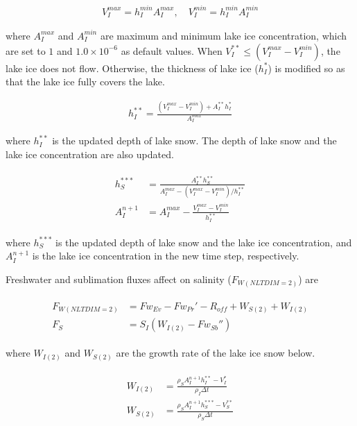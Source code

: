 \begin{eqnarray}
  V_I^{max} = h_I^{min}A_I^{max}, \quad V_I^{min} = h_I^{min}A_I^{min}
\end{eqnarray}

where \(A_I^{max}\) and \(A_I^{min}\) are maximum and minimum lake ice concentration, which are set to \(1\) and \(1.0\times 10^{-6}\) as default values. When
\(V_I^{\ast\ast} \le (V_I^{max}-V_I^{min})\), the lake ice does not flow. Otherwise, the thickness of lake ice (\(h_I^{\ast}\)) is modified so as that the lake ice fully covers the lake.

\begin{eqnarray}
  h_I^{\ast\ast} = \frac{(V_I^{max}-V_I^{min})+A_I^{\ast\ast}h_I^{\ast}}{A_I^{max}}
\end{eqnarray}

where \(h_I^{\ast\ast}\) is the updated depth of lake snow. The depth of lake snow and the lake ice concentration are also updated.

\begin{eqnarray}
\begin{array}{rl}
  h_S^{\ast\ast\ast} &= \frac{A_I^{\ast\ast}h_S^{\ast\ast}}{A_I^{max}-(V_I^{max}-V_I^{min})/h_I^{\ast\ast}}\\
  A_I^{n+1} &= A_I^{max} - \frac{V_I^{max}-V_I^{min}}{h_I^{\ast\ast}}
\end{array}
\end{eqnarray}

where \(h_S^{\ast\ast\ast}\) is the updated depth of lake snow and the lake ice concentration, and \(A_I^{n+1}\) is the lake ice concentration in the new time step, respectively.

Freshwater and sublimation fluxes affect on salinity (\(F_{W(NLTDIM=2)}\)) are

\begin{eqnarray}
\begin{array}{rl}
    F_{W(NLTDIM=2)} &=Fw_{Ev} - Fw_{Pr}' - R_{off} + W_{S(2)} + W_{I(2)} \\
    F_S &= S_I(W_{I(2)}-Fw_{Sb}'')
\end{array}
\end{eqnarray}

where \(W_{I(2)}\) and \(W_{S(2)}\) are the growth rate of the lake ice snow below.

\begin{eqnarray}
\begin{array}{rl}
    W_{I(2)} &= \frac{\rho_S A_I^{n+1} h_I^{\ast\ast} - V_I^{\ast}}{\rho_I \Delta t}\\
    W_{S(2)} &=  \frac{\rho_S A_I^{n+1} h_S^{\ast\ast\ast} - V_S^{\ast\ast}}{\rho_S \Delta t}
\end{array}
\end{eqnarray}

